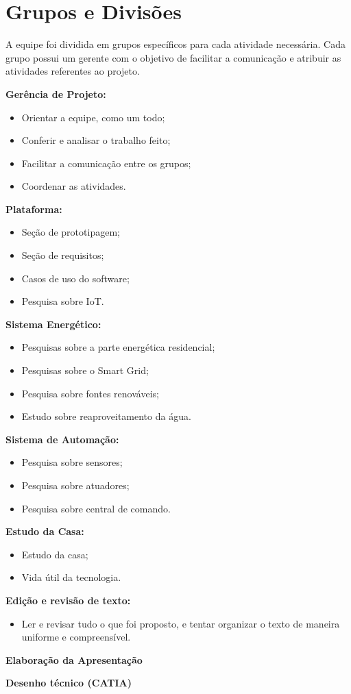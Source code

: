 \section{Grupos e Divisões}
\par A equipe foi dividida em  grupos específicos para cada atividade necessária. Cada grupo possui um gerente com o objetivo de facilitar a comunicação e atribuir as atividades referentes ao projeto.
\par \textbf{Gerência de Projeto:}
    \begin{itemize}
        \item Orientar a equipe, como um todo;
        \item Conferir e analisar o trabalho feito;
        \item Facilitar a comunicação entre os grupos;
        \item Coordenar as atividades.
    \end{itemize}
\par \textbf{Plataforma:}
    \begin{itemize}
        \item Seção de prototipagem;
        \item Seção de requisitos;
        \item Casos de uso do software;
        \item Pesquisa sobre IoT.
    \end{itemize}
\par \textbf{Sistema Energético:}
    \begin{itemize}
        \item Pesquisas sobre a parte energética residencial;
        \item Pesquisas sobre o Smart Grid;
        \item Pesquisa sobre fontes renováveis;
        \item Estudo sobre reaproveitamento da água.
    \end{itemize}
\par \textbf{Sistema de Automação:}
    \begin{itemize}
        \item Pesquisa sobre sensores;
        \item Pesquisa sobre atuadores;
        \item Pesquisa sobre central de comando.
    \end{itemize}
\par \textbf{Estudo da Casa:}
    \begin{itemize}
        \item Estudo da casa;
        \item Vida útil da tecnologia.
    \end{itemize}
\par \textbf{Edição e revisão de texto:}
    \begin{itemize}
        \item Ler e revisar tudo o que foi proposto, e tentar organizar o texto de maneira uniforme e compreensível.
    \end{itemize}
\par \textbf{Elaboração da Apresentação}
\par \textbf{Desenho técnico (CATIA)}

